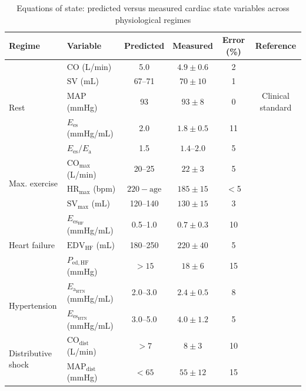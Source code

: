 \documentclass[10pt,twocolumn,a4paper]{article}
\theoremstyle{remark}
\newcommand{\Ees}{E_{\mathrm{es}}}
\newcommand{\Ea}{E_{\mathrm{a}}}
\newcommand{\CO}{\mathrm{CO}}
\newcommand{\SV}{\mathrm{SV}}
\newcommand{\HR}{\mathrm{HR}}
\newcommand{\MAP}{\mathrm{MAP}}
\newcommand{\EDV}{\mathrm{EDV}}
\begin{document}
\begin{table}[h]
\centering
\caption{Equations of state: predicted versus measured cardiac state variables across physiological regimes}
\label{tab:validation}
\begin{tabular}{llcccc}
\toprule
\textbf{Regime} & \textbf{Variable} & \textbf{Predicted} & \textbf{Measured} & \textbf{Error (\%)} & \textbf{Reference} \\
\midrule
\multirow{5}{*}{Rest}
& $\CO$ (L/min) & 5.0 & $4.9 \pm 0.6$ & 2 & \cite{ganz1971new} \\
& $\SV$ (mL) & 67--71 & $70 \pm 10$ & 1 & \cite{lewis1984pulsed} \\
& $\MAP$ (mmHg) & 93 & $93 \pm 8$ & 0 & Clinical standard \\
& $\Ees$ (mmHg/mL) & 2.0 & $1.8 \pm 0.5$ & 11 & \cite{suga1974instantaneous} \\
& $\Ees/\Ea$ & 1.5 & $1.4$--$2.0$ & 5 & \cite{sunagawa1985ventricular} \\
\midrule
\multirow{3}{*}{Max. exercise}
& $\CO_{\max}$ (L/min) & 20--25 & $22 \pm 3$ & 5 & \cite{saltin1968response} \\
& $\HR_{\max}$ (bpm) & $220 - \text{age}$ & $185 \pm 15$ & $<$5 & \cite{tanaka2001age} \\
& $\SV_{\max}$ (mL) & 120--140 & $130 \pm 15$ & 3 & \cite{saltin1968response} \\
\midrule
\multirow{3}{*}{Heart failure}
& $\Ees_{\mathrm{HF}}$ (mmHg/mL) & 0.5--1.0 & $0.7 \pm 0.3$ & 10 & \cite{kass1989ventricular} \\
& $\EDV_{\mathrm{HF}}$ (mL) & 180--250 & $220 \pm 40$ & 5 & \cite{kass1989ventricular} \\
& $P_{\mathrm{ed,HF}}$ (mmHg) & $>15$ & $18 \pm 6$ & 15 & \cite{mann2011braunwald} \\
\midrule
\multirow{2}{*}{Hypertension}
& $\Ea_{\mathrm{HTN}}$ (mmHg/mL) & 2.0--3.0 & $2.4 \pm 0.5$ & 8 & \cite{roman1995cardiac} \\
& $\Ees_{\mathrm{HTN}}$ (mmHg/mL) & 3.0--5.0 & $4.0 \pm 1.2$ & 5 & \cite{roman1995cardiac} \\
\midrule
\multirow{2}{*}{Distributive shock}
& $\CO_{\mathrm{dist}}$ (L/min) & $>7$ & $8 \pm 3$ & 10 & \cite{vincent1998icu} \\
& $\MAP_{\mathrm{dist}}$ (mmHg) & $<65$ & $55 \pm 12$ & 15 & \cite{vincent1998icu} \\
\bottomrule
\end{tabular}
\end{table}
\end{document}
